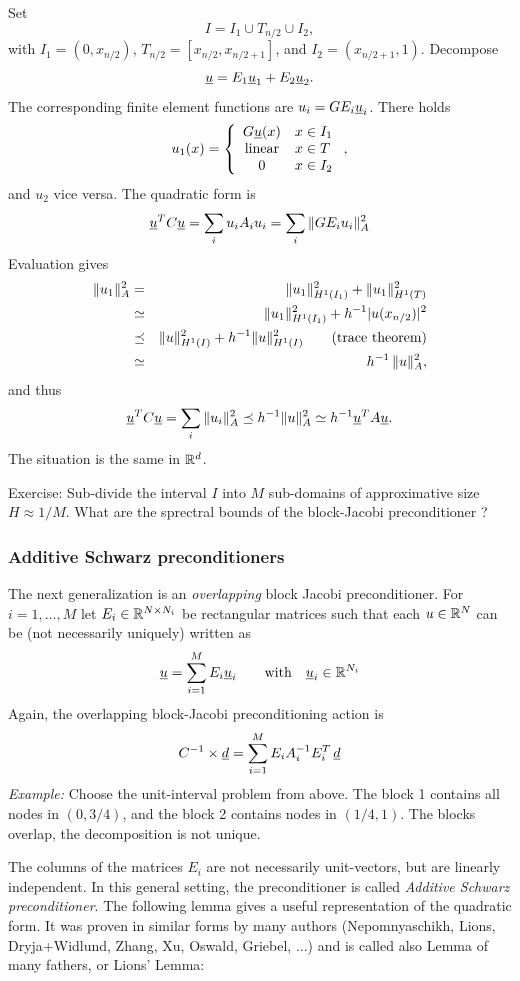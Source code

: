 Set
$$
I = I_1 \cup T_{n/2} \cup I_2,
$$
with $I_1 = (0, x_{n/2})$, $T_{n/2} = [x_{n/2},x_{n/2+1}]$, and
$I_2 = (x_{n/2+1}, 1)$. 
Decompose
$$
\underline u = E_1 \underline u_1 + E_2 \underline u_2.
$$
The corresponding finite element functions are $u_i = G E_i \underline u_i$. There
holds
$$
u_1 (x) = \left\{ \begin{array}{cl}
        G \underline u (x) &  x \in I_1 \\
        \mbox{linear} & x \in T \\
        0 & x \in I_2
        \end{array} \right.,
$$
and $u_2$ vice versa.  The quadratic form is
$$
\underline u^T C \underline u = \sum_i u_i A_i u_i = \sum_i \| G E_i u_i \|_A^2
$$
Evaluation gives 
\begin{eqnarray*}
\| u_1 \|_A^2 & = & \| u_1 \|_{H^1(I_1)}^2 + \| u_1 \|_{H^1(T)}^2 \\
        & \simeq & \| u_1 \|_{H^1(I_1)}^2 + h^{-1} | u(x_{n/2}) |^2 \\
        & \preceq & \| u \|_{H^1(I)}^2 + h^{-1} \| u \|_{H^1(I)}^2 \qquad
        \mbox{(trace theorem)} \\
        & \simeq & h^{-1}  \, \| u \|_A^2,
\end{eqnarray*}
and thus
$$
\underline u^T C \underline u = \sum_i \| u_i \|_A^2 \preceq h^{-1} \| u \|_A^2 \simeq h^{-1} \underline u^T A \underline u.
$$
The situation is the same in ${\mathbb R}^d$.

Exercise: Sub-divide the interval $I$ into $M$ sub-domains of approximative
size $H \approx 1/M$. What are the sprectral bounds of the block-Jacobi
preconditioner ?

\subsubsection{Additive Schwarz preconditioners}

The next generalization is an {\em overlapping}
block Jacobi preconditioner. For $i = 1, \ldots, M$ let $E_i \in {\mathbb R}^{N \times N_i}$ be rectangular matrices such that each $u \in {\mathbb R}^N$ can be 
(not necessarily uniquely) written as
$$
\underline u = \sum_{i=1}^M E_i \underline u_i \qquad \mbox{with} \quad \underline u_i \in {\mathbb R}^{N_i}
$$
Again, the overlapping block-Jacobi preconditioning action is
$$
C^{-1} \times \underline d = \sum_{i=1}^M E_i A_i^{-1} E_i^T \, \underline d
$$
{\em Example:} Choose the unit-interval problem from above. The block 1
contains all nodes in $(0, 3/4)$, and the block 2 contains nodes in $(1/4,1)$.
The blocks overlap, the decomposition is not unique.

The columns of the matrices $E_i$ are not necessarily unit-vectors, but  
are linearly independent.
In this general setting, the preconditioner is called 
{\em Additive Schwarz preconditioner}. The following lemma gives
a useful representation of the quadratic form. It was proven in similar
forms by many authors (Nepomnyaschikh, Lions, Dryja+Widlund, Zhang, Xu, Oswald, Griebel, ...) and is called also Lemma of many fathers, or Lions' Lemma:

